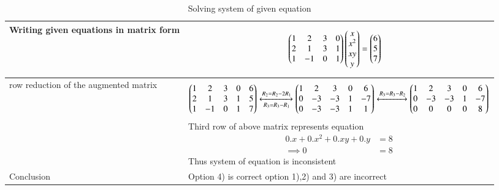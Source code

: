 \documentclass[journal,12pt,twocolumn]{IEEEtran}
\begin{document}
\begin{table}[h!]
\begin{center}
\begin{tabular}{|m{4cm}|m{13cm}|}\hline
        Writing given equations in matrix form &  {\begin{align*}
            \begin{pmatrix}1&2&3&0\\2&1&3&1\\1&-1&0&1\end{pmatrix}\begin{pmatrix}x\\x^2\\xy\\y\end{pmatrix} &= \begin{pmatrix}6\\5\\7\end{pmatrix}
        \end{align*}}\\
        \hline
        row reduction of the augmented matrix & {\begin{align*}
            \begin{pmatrix}1&2&3&0&6\\2&1&3&1&5\\1&-1&0&1&7\end{pmatrix}\xleftrightarrow[R_3=R_3-R_1]{R_2=R_2-2R_1}\begin{pmatrix}1&2&3&0&6\\0&-3&-3&1&-7\\0&-3&-3&1&1\end{pmatrix}\xleftrightarrow{R_3=R_3-R_2}\begin{pmatrix}1&2&3&0&6\\0&-3&-3&1&-7\\0&0&0&0&8\end{pmatrix}
        \end{align*}}
        Third row of above matrix represents equation
        {\begin{align*}
            0.x+0.x^2+0.xy+0.y &= 8\\
            \implies 0 &= 8
        \end{align*}}
        Thus system of equation is inconsistent\\
        \hline
        Conclusion & Option 4) is correct option 1),2) and 3) are incorrect\\
        \hline
\end{tabular}
\end{center}
\caption{Solving system of given equation}
\label{tab:my_label}
\end{table}
\end{document}
